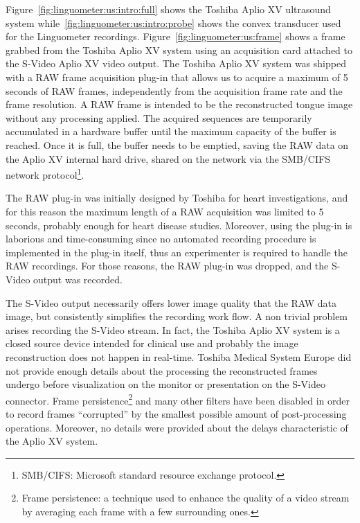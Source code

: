 
Figure~\ref{fig:linguometer:us:intro:full} shows the Toshiba Aplio XV ultrasound
system while~\ref{fig:linguometer:us:intro:probe} shows the convex transducer 
used for the Linguometer recordings.
Figure~\ref{fig:linguometer:us:frame} shows a frame grabbed from the
Toshiba Aplio XV system using an acquisition card attached to the S-Video
Aplio XV video output.
The Toshiba Aplio XV system was shipped with a RAW frame acquisition plug-in
that
allows us to acquire a maximum of 5 seconds of RAW frames, independently from
the acquisition frame rate and the frame resolution.
A RAW frame is intended to be the reconstructed tongue image without any
processing applied.
The acquired sequences are temporarily accumulated in a hardware buffer until
the maximum capacity of the buffer is reached. 
Once it is full, the buffer needs to be emptied, saving the RAW data on the 
Aplio XV internal hard drive, shared on the network via the SMB/CIFS network
protocol\footnote{SMB/CIFS: Microsoft standard resource exchange protocol.}.

The RAW plug-in was initially designed by Toshiba for heart investigations, and
for this reason the maximum length of a RAW acquisition was limited to 5
seconds,
probably enough for heart disease studies.
Moreover, using the plug-in is laborious and time-consuming since no automated 
recording procedure is implemented in the plug-in itself, thus an experimenter
is required to handle the RAW recordings.
For those reasons, the RAW plug-in was dropped, and the S-Video output was
recorded. 

The S-Video output necessarily offers lower image quality that the
RAW data image, but consistently simplifies the recording work flow.
A non trivial problem arises recording the S-Video stream. In fact, the 
Toshiba Aplio XV system is a closed source device intended for clinical use 
and probably the image reconstruction does not happen in real-time. 
Toshiba Medical System Europe did not provide enough details about the
processing the reconstructed frames undergo before visualization on the monitor
or presentation on the S-Video connector. 
Frame persistence\footnote{Frame persistence: a technique used to enhance the
quality of a video stream by averaging each frame with a few surrounding ones.} 
and many other filters have been disabled in
order to record frames ``corrupted'' by the smallest possible amount of 
post-processing operations.
Moreover, no details were provided about the delays characteristic of the Aplio
XV system.
